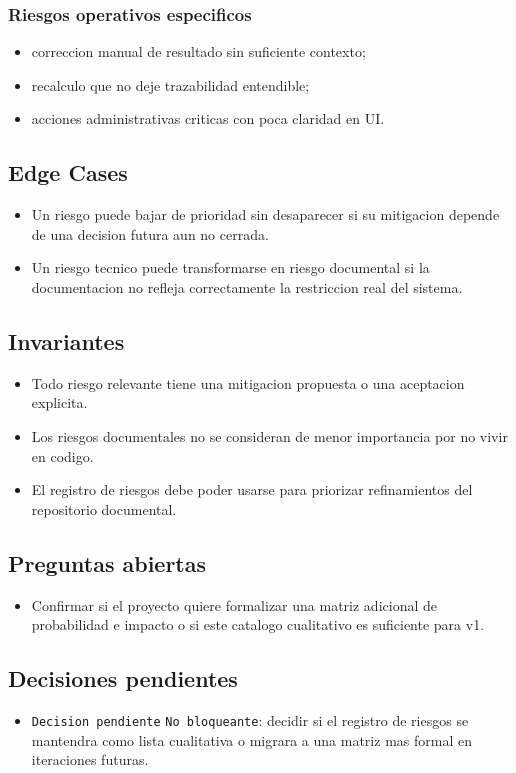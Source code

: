 \subsubsection{Riesgos operativos especificos}

\begin{itemize}
  \item correccion manual de resultado sin suficiente contexto;
  \item recalculo que no deje trazabilidad entendible;
  \item acciones administrativas criticas con poca claridad en UI.
\end{itemize}

\subsection{Edge Cases}

\begin{itemize}
  \item Un riesgo puede bajar de prioridad sin desaparecer si su mitigacion depende de una decision futura aun no cerrada.
  \item Un riesgo tecnico puede transformarse en riesgo documental si la documentacion no refleja correctamente la restriccion real del sistema.
\end{itemize}

\subsection{Invariantes}

\begin{itemize}
  \item Todo riesgo relevante tiene una mitigacion propuesta o una aceptacion explicita.
  \item Los riesgos documentales no se consideran de menor importancia por no vivir en codigo.
  \item El registro de riesgos debe poder usarse para priorizar refinamientos del repositorio documental.
\end{itemize}

\subsection{Preguntas abiertas}

\begin{itemize}
  \item Confirmar si el proyecto quiere formalizar una matriz adicional de probabilidad e impacto o si este catalogo cualitativo es suficiente para v1.
\end{itemize}

\subsection{Decisiones pendientes}

\begin{itemize}
  \item \texttt{Decision pendiente} \texttt{No bloqueante}: decidir si el registro de riesgos se mantendra como lista cualitativa o migrara a una matriz mas formal en iteraciones futuras.
\end{itemize}
